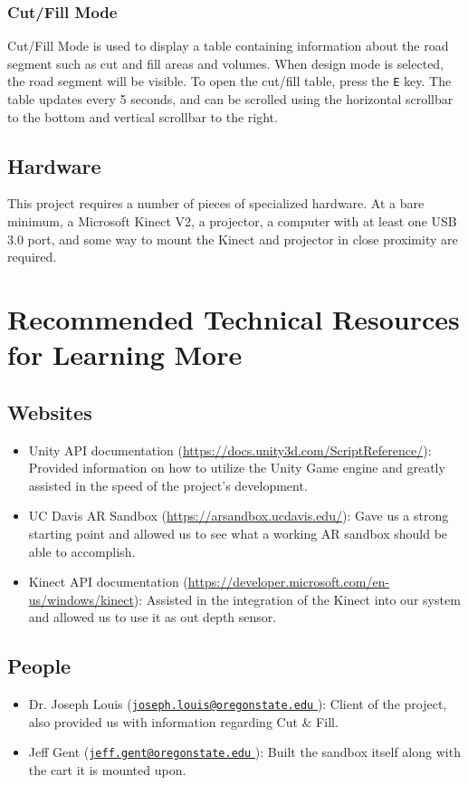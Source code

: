 \documentclass[onecolumn, draftclsnofoot,10pt, compsoc]{IEEEtran}
\begin{document}
\subsubsection{Cut/Fill Mode}
Cut/Fill Mode is used to display a table containing information about the road segment such as cut and fill areas and volumes. When design mode is selected, the road segment will be visible. To open the cut/fill table, press the \texttt{E} key. The table updates every 5 seconds, and can be scrolled using the horizontal scrollbar to the bottom and vertical scrollbar to the right.
\subsection{Hardware}
This project requires a number of pieces of specialized hardware. At a bare minimum, a Microsoft Kinect V2, a projector, a computer with at least one USB 3.0 port, and some way to mount the Kinect and projector in close proximity are required.

\section{Recommended Technical Resources for Learning More}
\subsection{Websites}
\begin{itemize}
\item Unity API documentation (\url{https://docs.unity3d.com/ScriptReference/}): Provided information on how to utilize the Unity Game engine and greatly assisted in the speed of the project's development.
\item UC Davis AR Sandbox (\url{https://arsandbox.ucdavis.edu/}): Gave us a strong starting point and allowed us to see what a working AR sandbox should be able to accomplish.
\item Kinect API documentation (\url{https://developer.microsoft.com/en-us/windows/kinect}): Assisted in the integration of the Kinect into our system and allowed us to use it as out depth sensor.
\end{itemize}

\subsection{People}
\begin{itemize}
\item Dr. Joseph Louis (\href{mailto:joseph.louis@oregonstate.edu}{\nolinkurl{joseph.louis@oregonstate.edu} }): Client of the project, also provided us with information regarding Cut \& Fill.
\item Jeff Gent (\href{mailto:jeff.gent@oregonstate.edu}{\nolinkurl{jeff.gent@oregonstate.edu} }): Built the sandbox itself along with the cart it is mounted upon.
\end{itemize}
\end{document}
